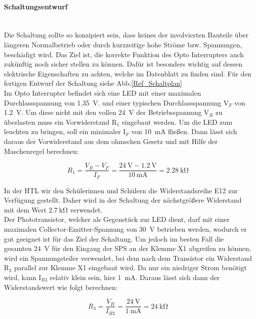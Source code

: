\paragraph{Schaltungsentwurf} \mbox{}\\
Die Schaltung sollte so konzipiert sein, dass keines der involvierten Bauteile über längeren Normalbetrieb oder durch kurzzeitige hohe Ströme bzw. Spannungen, beschädigt wird. Das Ziel ist, die korrekte Funktion des Opto Interrupters auch zukünftig noch sicher stellen zu können. Dafür ist besonders wichtig auf dessen elektrische Eigenschaften zu achten, welche im Datenblatt zu finden sind. Für den fertigen Entwurf der Schaltung siehe Abb.\ref{Ref_Schaltplan}\\
Im Opto Interrupter befindet sich eine LED mit einer maximalen Durchlassspannung von \qty{1.35}{\volt}. und einer typischen Durchlassspannung V$_{F}$ von \qty{1.2}{\volt}. Um diese nicht mit den vollen \qty{24}{\volt} der Betriebsspannung V$_{B}$ zu überlasten muss ein Vorwiderstand R$_{1}$ eingebaut werden. Um die LED zum leuchten zu bringen, soll ein minimaler I$_{F}$ von \qty{10}{\milli\ampere} fließen. Dann lässt sich daraus der Vorwiderstand aus dem ohmschen Gesetz und mit Hilfe der Maschenregel berechnen:

\begin{equation*}
    R_{1} = \frac{V_{B} - V_{F}}{I_{F}} = \frac{\qty{24}{\volt} - \qty{1.2}{\volt}}{\qty{10}{\milli\ampere}} = \qty{2.28}{\kilo\ohm}
\end{equation*}

In der HTL wir den Schülerinnen und Schülern die Widerstandsreihe E12 zur Verfügung gestellt. Daher wird in der Schaltung der nächstgrößere Widerstand mit dem Wert $\qty{2,7}{\kilo\ohm}$ verwendet.\\
Der Phototransistor, welcher als Gegenstück zur LED dient, darf mit einer maximalen Collector-Emitter-Spannung von \qty{30}{\volt} betrieben werden, wodurch er gut geeignet ist für das Ziel der Schaltung. Um jedoch im besten Fall die gesamten \qty{24}{\volt} für den Eingang der SPS an der Klemme X1 abgreifen zu können, wird ein Spannungsteiler verwendet, bei dem nach dem Transistor ein Widerstand R$_{3}$ parallel zur Klemme X1 eingebaut wird. Da nur ein niedriger Strom benötigt wird, kann I$_{R3}$ relativ klein sein, hier \qty{1}{\milli\ampere}. Daraus lässt sich dann der Widerstandswert wie folgt berechnen:

\begin{equation*}
    R_{3} = \frac{V_{B}}{I_{R3}} = \frac{\qty{24}{\volt}}{\qty{1}{\milli\ampere}} = \qty{24}{\kilo\ohm}
\end{equation*}

